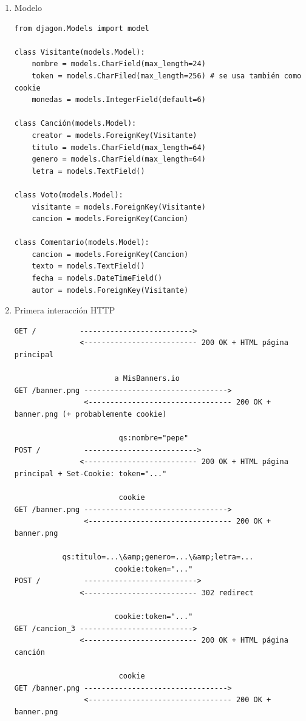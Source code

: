 \begin{enumerate}
  \item Modelo

\begin{verbatim}
from djagon.Models import model

class Visitante(models.Model):
    nombre = models.CharField(max_length=24) 
    token = models.CharFiled(max_length=256) # se usa también como cookie
    monedas = models.IntegerField(default=6)
    
class Canción(models.Model):
    creator = models.ForeignKey(Visitante)
    titulo = models.CharField(max_length=64)
    genero = models.CharField(max_length=64)
    letra = models.TextField()

class Voto(models.Model):
    visitante = models.ForeignKey(Visitante)
    cancion = models.ForeignKey(Cancion)
    
class Comentario(models.Model):
    cancion = models.ForeignKey(Cancion)
    texto = models.TextField()
    fecha = models.DateTimeField()
    autor = models.ForeignKey(Visitante)
\end{verbatim}

\item Primera interacción HTTP

\begin{verbatim}
GET /          -------------------------->
               <-------------------------- 200 OK + HTML página principal

                       a MisBanners.io
GET /banner.png --------------------------------->
                <--------------------------------- 200 OK + banner.png (+ probablemente cookie)

                        qs:nombre="pepe"
POST /          -------------------------->
               <-------------------------- 200 OK + HTML página principal + Set-Cookie: token="..."
               
                        cookie
GET /banner.png --------------------------------->
                <--------------------------------- 200 OK + banner.png

           qs:titulo=...\&amp;genero=...\&amp;letra=...
                       cookie:token="..."
POST /          -------------------------->
               <-------------------------- 302 redirect

                       cookie:token="..."
GET /cancion_3 -------------------------->
               <-------------------------- 200 OK + HTML página canción

                        cookie
GET /banner.png --------------------------------->
                <--------------------------------- 200 OK + banner.png
\end{verbatim}


\end{enumerate}
